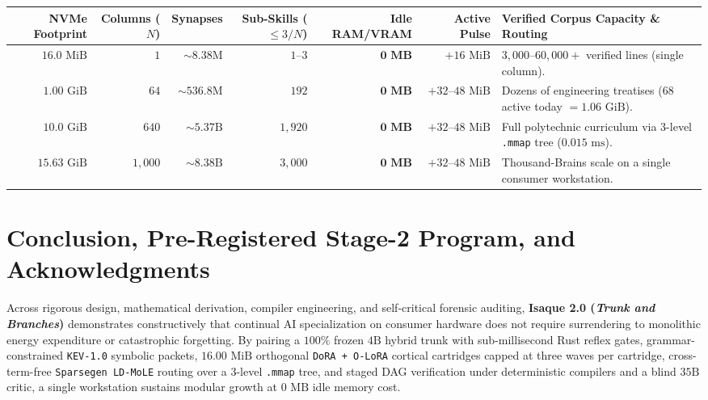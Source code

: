 \documentclass[10pt,a4paper]{article}
\begin{document}
\begin{table}[!htbp]
\vspace{4pt}
\begin{tabularx}{\linewidth}{@{}rrrrrrY@{}}
\toprule
\textbf{NVMe Footprint} & \textbf{Columns ($N$)} & \textbf{Synapses} & \textbf{Sub-Skills ($\le 3/N$)} & \textbf{Idle RAM/VRAM} & \textbf{Active Pulse} & \textbf{Verified Corpus Capacity \& Routing} \\
\midrule
$16.0\text{ MiB}$  & $1$     & $\sim 8.38\text{M}$  & $1\text{--}3$       & $\mathbf{0\text{ MB}}$ & $+16\text{ MiB}$      & $3,000\text{--}60,000+$ verified lines (single column). \\
$1.00\text{ GiB}$  & $64$    & $\sim 536.8\text{M}$ & $192$               & $\mathbf{0\text{ MB}}$ & $+32\text{--}48\text{ MiB}$ & Dozens of engineering treatises ($68$ active today $= 1.06\text{ GiB}$). \\
$10.0\text{ GiB}$ & $640$   & $\sim 5.37\text{B}$  & $1,920$             & $\mathbf{0\text{ MB}}$ & $+32\text{--}48\text{ MiB}$ & Full polytechnic curriculum via 3-level \texttt{.mmap} tree ($0.015\text{ ms}$). \\
$15.63\text{ GiB}$ & $1,000$ & $\sim 8.38\text{B}$  & $3,000$             & $\mathbf{0\text{ MB}}$ & $+32\text{--}48\text{ MiB}$ & Thousand-Brains scale on a single consumer workstation. \\
\bottomrule
\end{tabularx}
\end{table}

\section{Conclusion, Pre-Registered Stage-2 Program, and Acknowledgments}

Across rigorous design, mathematical derivation, compiler engineering, and self-critical forensic auditing, \textbf{Isaque 2.0 (\textit{Trunk and Branches})} demonstrates constructively that continual AI specialization on consumer hardware does not require surrendering to monolithic energy expenditure or catastrophic forgetting. By pairing a $100\%$ frozen $4\text{B}$ hybrid trunk with sub-millisecond Rust reflex gates, grammar-constrained \texttt{KEV-1.0} symbolic packets, $16.00\text{ MiB}$ orthogonal \texttt{DoRA + O-LoRA} cortical cartridges capped at three waves per cartridge, cross-term-free \texttt{Sparsegen LD-MoLE} routing over a 3-level \texttt{.mmap} tree, and staged DAG verification under deterministic compilers and a blind $35\text{B}$ critic, a single workstation sustains modular growth at $0\text{ MB}$ idle memory cost.
\end{document}
